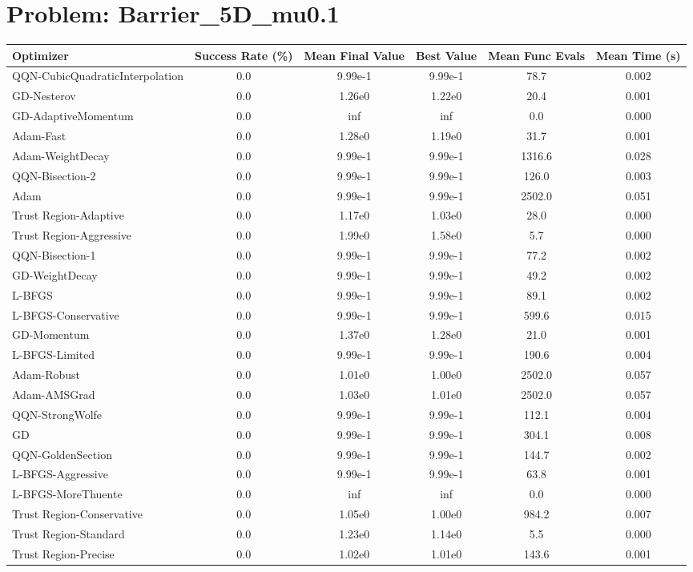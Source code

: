 \documentclass{article}
\begin{document}
\section{Problem: Barrier\_5D\_mu0.1}
\begin{longtable}{p{3cm}*{5}{c}}
\toprule
\textbf{Optimizer} & \textbf{Success Rate (\%)} & \textbf{Mean Final Value} & \textbf{Best Value} & \textbf{Mean Func Evals} & \textbf{Mean Time (s)} \\
\midrule
QQN-CubicQuadraticInterpolation & 0.0 & 9.99e-1 & 9.99e-1 & 78.7 & 0.002 \\
GD-Nesterov & 0.0 & 1.26e0 & 1.22e0 & 20.4 & 0.001 \\
GD-AdaptiveMomentum & 0.0 & inf & inf & 0.0 & 0.000 \\
Adam-Fast & 0.0 & 1.28e0 & 1.19e0 & 31.7 & 0.001 \\
Adam-WeightDecay & 0.0 & 9.99e-1 & 9.99e-1 & 1316.6 & 0.028 \\
QQN-Bisection-2 & 0.0 & 9.99e-1 & 9.99e-1 & 126.0 & 0.003 \\
Adam & 0.0 & 9.99e-1 & 9.99e-1 & 2502.0 & 0.051 \\
Trust Region-Adaptive & 0.0 & 1.17e0 & 1.03e0 & 28.0 & 0.000 \\
Trust Region-Aggressive & 0.0 & 1.99e0 & 1.58e0 & 5.7 & 0.000 \\
QQN-Bisection-1 & 0.0 & 9.99e-1 & 9.99e-1 & 77.2 & 0.002 \\
GD-WeightDecay & 0.0 & 9.99e-1 & 9.99e-1 & 49.2 & 0.002 \\
L-BFGS & 0.0 & 9.99e-1 & 9.99e-1 & 89.1 & 0.002 \\
L-BFGS-Conservative & 0.0 & 9.99e-1 & 9.99e-1 & 599.6 & 0.015 \\
GD-Momentum & 0.0 & 1.37e0 & 1.28e0 & 21.0 & 0.001 \\
L-BFGS-Limited & 0.0 & 9.99e-1 & 9.99e-1 & 190.6 & 0.004 \\
Adam-Robust & 0.0 & 1.01e0 & 1.00e0 & 2502.0 & 0.057 \\
Adam-AMSGrad & 0.0 & 1.03e0 & 1.01e0 & 2502.0 & 0.057 \\
QQN-StrongWolfe & 0.0 & 9.99e-1 & 9.99e-1 & 112.1 & 0.004 \\
GD & 0.0 & 9.99e-1 & 9.99e-1 & 304.1 & 0.008 \\
QQN-GoldenSection & 0.0 & 9.99e-1 & 9.99e-1 & 144.7 & 0.002 \\
L-BFGS-Aggressive & 0.0 & 9.99e-1 & 9.99e-1 & 63.8 & 0.001 \\
L-BFGS-MoreThuente & 0.0 & inf & inf & 0.0 & 0.000 \\
Trust Region-Conservative & 0.0 & 1.05e0 & 1.00e0 & 984.2 & 0.007 \\
Trust Region-Standard & 0.0 & 1.23e0 & 1.14e0 & 5.5 & 0.000 \\
Trust Region-Precise & 0.0 & 1.02e0 & 1.01e0 & 143.6 & 0.001 \\
\bottomrule
\end{longtable}
\end{document}
